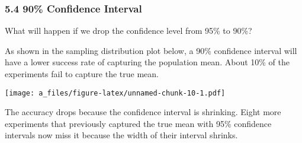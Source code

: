 \documentclass[
]{article}
\newenvironment{Shaded}{\begin{snugshade}}{\end{snugshade}}
\newcommand{\AttributeTok}[1]{\textcolor[rgb]{0.77,0.63,0.00}{#1}}
\newcommand{\DecValTok}[1]{\textcolor[rgb]{0.00,0.00,0.81}{#1}}
\newcommand{\FloatTok}[1]{\textcolor[rgb]{0.00,0.00,0.81}{#1}}
\newcommand{\FunctionTok}[1]{\textcolor[rgb]{0.00,0.00,0.00}{#1}}
\newcommand{\NormalTok}[1]{#1}
\newcommand{\OtherTok}[1]{\textcolor[rgb]{0.56,0.35,0.01}{#1}}
\newcommand{\SpecialCharTok}[1]{\textcolor[rgb]{0.00,0.00,0.00}{#1}}
\newcommand{\StringTok}[1]{\textcolor[rgb]{0.31,0.60,0.02}{#1}}
\begin{document}
\hypertarget{confidence-interval-1}{%
\subsubsection{5.4 90\% Confidence
Interval}\label{confidence-interval-1}}

What will happen if we drop the confidence level from 95\% to 90\%?

As shown in the sampling distribution plot below, a 90\% confidence
interval will have a lower success rate of capturing the population
mean. About 10\% of the experiments fail to capture the true mean.

\begin{Shaded}
\end{Shaded}

\texttt{[image: a\_files/figure-latex/unnamed-chunk-10-1.pdf]}

The accuracy drops because the confidence interval is shrinking. Eight
more experiments that previously captured the true mean with 95\%
confidence intervals now miss it because the width of their interval
shrinks.

\begin{Shaded}
\end{Shaded}
\end{document}
